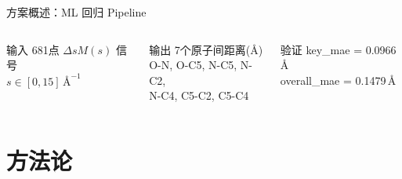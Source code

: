 \documentclass[aspectratio=169,9pt]{beamer}
\newcommand{\dsm}{\Delta sM}
\newcommand{\anginv}{\,\text{\AA}^{-1}}
\begin{document}
\begin{frame}{方案概述：ML 回归 Pipeline}
  \vspace{4pt}
  \begin{columns}[T]
    \begin{block}{输入}
      \scriptsize
      681点 $\dsm(s)$ 信号\\
      $s \in [0, 15]\anginv$
    \end{block}
    \begin{block}{输出}
      \scriptsize
      7个原子间距离(\AA)\\
      O-N, O-C5, N-C5, N-C2,\\N-C4, C5-C2, C5-C4
    \end{block}
    \begin{block}{验证}
      \scriptsize
      key\_mae = 0.0966\,\AA\\
      overall\_mae = 0.1479\,\AA
    \end{block}
  \end{columns}
\end{frame}

\section{方法论}
\end{document}

